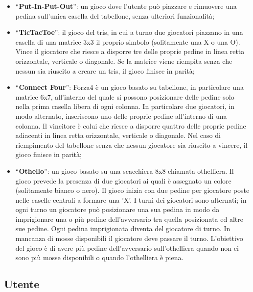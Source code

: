 \begin{itemize}
    \item ``\textbf{Put-In-Put-Out}'': un gioco dove l'utente può piazzare e rimuovere una pedina sull'unica casella del tabellone, senza ulteriori funzionalità;
    \item ``\textbf{TicTacToe}'': il gioco del tris, in cui a turno due giocatori piazzano in una casella di una matrice 3x3 il proprio simbolo (solitamente una X o una O).
    Vince il giocatore che riesce a disporre tre delle proprie pedine in linea retta orizzontale, verticale o diagonale.
    Se la matrice viene riempita senza che nessun sia riuscito a creare un tris, il gioco finisce in parità;
    \item ``\textbf{Connect Four}'': Forza4 è un gioco basato su tabellone, in particolare una matrice 6x7, all'interno del quale si possono posizionare delle pedine solo nella prima casella libera di ogni colonna.
    In particolare due giocatori, in modo alternato, inseriscono uno delle proprie pedine all'interno di una colonna.
    Il vincitore è colui che riesce a disporre quattro delle proprie pedine adiacenti in linea retta orizzontale, verticale o diagonale.
    Nel caso di riempimento del tabellone senza che nessun giocatore sia riuscito a vincere, il gioco finisce in parità;
    \item ``\textbf{Othello}'': un gioco basato su una scacchiera 8x8 chiamata othelliera.
    Il gioco prevede la presenza di due giocatori ai quali è assegnato un colore (solitamente bianco o nero). 
    Il gioco inizia con due pedine per giocatore poste nelle caselle centrali a formare una 'X'.
    I turni dei giocatori sono alternati; in ogni turno un giocatore può posizionare una sua pedina in modo da imprigionare una o più pedine dell'avversario tra quella posizionata ed altre sue pedine.
    Ogni pedina imprigionata diventa del giocatore di turno. 
    In mancanza di mosse disponibili il giocatore deve passare il turno.
    L'obiettivo del gioco è di avere più pedine dell'avversario sull'othelliera quando non ci sono più mosse disponibili o quando l'othelliera è piena.
\end{itemize}

\subsection{Utente}

